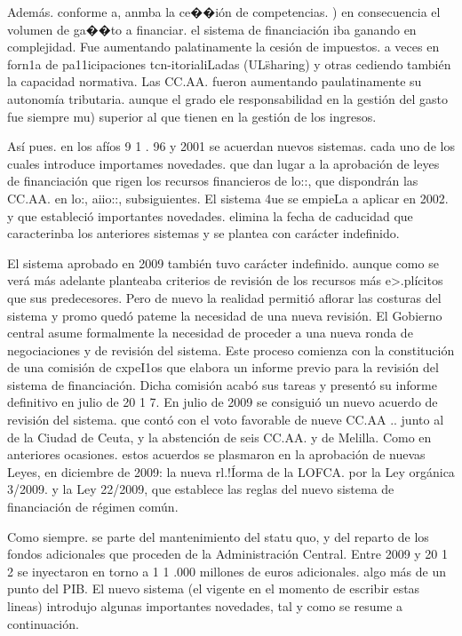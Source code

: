 \documentclass[10pt,a4paper]{article}
\begin{document}
Además. conforme a, anmba la ce��ión de competencias. ) en consecuencia el volumen de ga��to a financiar. el sistema de financiación iba ganando en complejidad. Fue aumentando palatinamente la cesión de impuestos. a veces en forn1a de pa11icipaciones tcn-itorialiLadas (UL\" sharing) y otras cediendo también la capacidad normativa. Las CC.AA. fueron aumentando paulatinamente su autonomía tributaria. aunque el grado ele responsabilidad en la gestión del gasto fue siempre mu) superior al que tienen en la gestión de los ingresos.

Así pues. en los afíos 9 1 . 96 y 2001 se acuerdan nuevos sistemas. cada uno de los cuales introduce importames novedades. que dan lugar a la aprobación de leyes de financiación que rigen los recursos financieros de lo::, que dispondrán las CC.AA. en lo:, aiio::, subsiguientes. El sistema 4ue se empieLa a aplicar en 2002. y que estableció importantes novedades. elimina la fecha de caducidad que caracterinba los anteriores sistemas y se plantea con carácter indefinido.

El sistema aprobado en 2009 también tuvo carácter indefinido. aunque como se verá más adelante planteaba criterios de revisión de los recursos más e>.plícitos que sus predecesores. Pero de nuevo la realidad permitió aflorar las costuras del sistema y promo quedó pateme la necesidad de una nueva revisión. El Gobierno central asume formalmente la necesidad de proceder a una nueva ronda de negociaciones y de revisión del sistema. Este proceso comienza con la constitución de una comisión de cxpeI1os que elabora un informe previo para la revisión del sistema de financiación. Dicha comisión acabó sus tareas y presentó su informe definitivo en julio de 20 1 7. En julio de 2009 se consiguió un nuevo acuerdo de revisión del sistema. que contó con el voto favorable de nueve CC.AA .. junto al de la Ciudad de Ceuta, y la abstención de seis CC.AA. y de Melilla. Como en anteriores ocasiones. estos acuerdos se plasmaron en la aprobación de nuevas Leyes, en diciembre de 2009: la nueva rl.!Íorma de la LOFCA. por la Ley orgánica 3/2009. y la Ley 22/2009, que establece las reglas del nuevo sistema de financiación de régimen común.

Como siempre. se parte del mantenimiento del statu quo, y del reparto de los fondos adicionales que proceden de la Administración Central. Entre 2009 y 20 1 2 se inyectaron en torno a 1 1 .000 millones de euros adicionales. algo más de un punto del PIB. El nuevo sistema (el vigente en el momento de escribir estas lineas) introdujo algunas importantes novedades, tal y como se resume a continuación.
\end{document}

